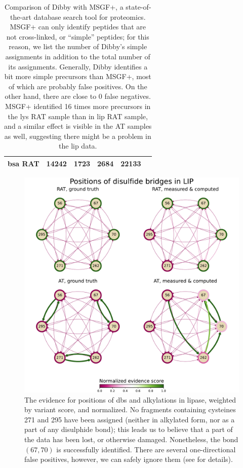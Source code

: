 \begin{table}[hb]
\begin{tabular}{@{}llllll@{}}
    \gls*{bsa} RAT                                       & 14242                           & 1723                                                                   & 2684                              & 22133 &             \\ \bottomrule
  \end{tabular}
  \caption{Comparison of Dibby with MSGF+, a state-of-the-art database search tool for proteomics. MSGF+ can only identify peptides that are not cross-linked, or ``simple'' peptides; for this reason, we list the number of Dibby's simple assignments in addition to the total number of its assignments. Generally, Dibby identifies a bit more simple precursors than MSGF+, most of which are probably false positives. On the other hand, there are close to 0 false negatives. MSGF+ identified 16 times more precursors in the \gls*{lys} RAT sample than in \gls*{lip} RAT sample, and a similar effect is visible in the AT samples as well, suggesting there might be a problem in the \gls*{lip} data.}\label{tbl:measurements}
\end{table}

\begin{figure}
  \centering
  \includegraphics[width=0.9\linewidth]{img/pdfa-lip.pdf}
  \caption{The evidence for positions of \glspl*{db} and alkylations in lipase, weighted by variant score, and normalized. No fragments containing cysteines 271 and 295 have been assigned (neither in alkylated form, nor as a part of any disulphide bond); this leads us to believe that a part of the data has been lost, or otherwise damaged. Nonetheless, the bond \((67, 70)\) is successfully identified. There are several one-directional false positives, however, we can safely ignore them (see  for details).}\label{fig:lip}
\end{figure}

